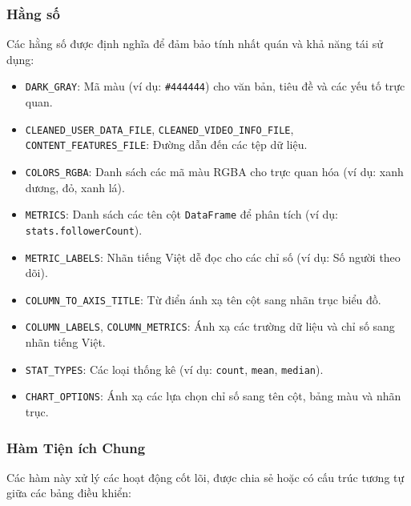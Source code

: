 \subsubsection{Hằng số}

\noindent
Các hằng số được định nghĩa để đảm bảo tính nhất quán và khả năng tái sử dụng:

\begin{itemize}
    \item \texttt{DARK\_GRAY}: Mã màu (ví dụ: \texttt{\#444444}) cho văn bản, tiêu đề và các yếu tố trực quan.
    \item \texttt{CLEANED\_USER\_DATA\_FILE}, \texttt{CLEANED\_VIDEO\_INFO\_FILE}, \texttt{CONTENT\_FEATURES\_FILE}: Đường dẫn đến các tệp dữ liệu.
    \item \texttt{COLORS\_RGBA}: Danh sách các mã màu RGBA cho trực quan hóa (ví dụ: xanh dương, đỏ, xanh lá).
    \item \texttt{METRICS}: Danh sách các tên cột \texttt{DataFrame} để phân tích (ví dụ: \texttt{stats.followerCount}).
    \item \texttt{METRIC\_LABELS}: Nhãn tiếng Việt dễ đọc cho các chỉ số (ví dụ: Số người theo dõi).
    \item \texttt{COLUMN\_TO\_AXIS\_TITLE}: Từ điển ánh xạ tên cột sang nhãn trục biểu đồ.
    \item \texttt{COLUMN\_LABELS}, \texttt{COLUMN\_METRICS}: Ánh xạ các trường dữ liệu và chỉ số sang nhãn tiếng Việt.
    \item \texttt{STAT\_TYPES}: Các loại thống kê (ví dụ: \texttt{count}, \texttt{mean}, \texttt{median}).
    \item \texttt{CHART\_OPTIONS}: Ánh xạ các lựa chọn chỉ số sang tên cột, bảng màu và nhãn trục.
\end{itemize}


\subsubsection{Hàm Tiện ích Chung}

Các hàm này xử lý các hoạt động cốt lõi, được chia sẻ hoặc có cấu trúc tương tự giữa các bảng điều khiển:

